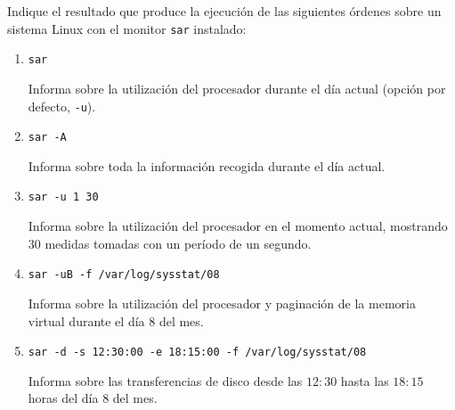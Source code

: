 \begin{ejercicio}
    Indique el resultado que produce la ejecución de las siguientes órdenes sobre un sistema Linux con el monitor \verb|sar| instalado:
    \begin{enumerate}
        \item \verb|sar|
        
        Informa sobre la utilización del procesador durante el día actual (opción por defecto, \verb|-u|).
        \item \verb|sar -A|
        
        Informa sobre toda la información recogida durante el día actual.
        \item \verb|sar -u 1 30|
        
        Informa sobre la utilización del procesador en el momento actual, mostrando 30 medidas tomadas con un período de un segundo.
        \item \verb|sar -uB -f /var/log/sysstat/08|
        
        Informa sobre la utilización del procesador y paginación de la memoria virtual durante el día 8 del mes.
        \item \verb|sar -d -s 12:30:00 -e 18:15:00 -f /var/log/sysstat/08|
        
        Informa sobre las transferencias de disco desde las $12:30$ hasta las $18:15$ horas del día 8 del mes.
    \end{enumerate}
\end{ejercicio}
\begin{comment}
    Solución:
    \begin{enumerate}
        \item Utilización del procesador durante el día actual.
        \item Toda la información recogida durante el día actual.
        \item Utilización actual del procesador: 30 medidas tomadas con un período de un segundo.
        \item Utilización del procesador y paginación de la memoria virtual durante el día 8 del mes.
        \item Transferencias de disco desde las $12:30$ hasta las $18:15$ horas del día 8 del mes. 
    \end{enumerate}
\end{comment}

